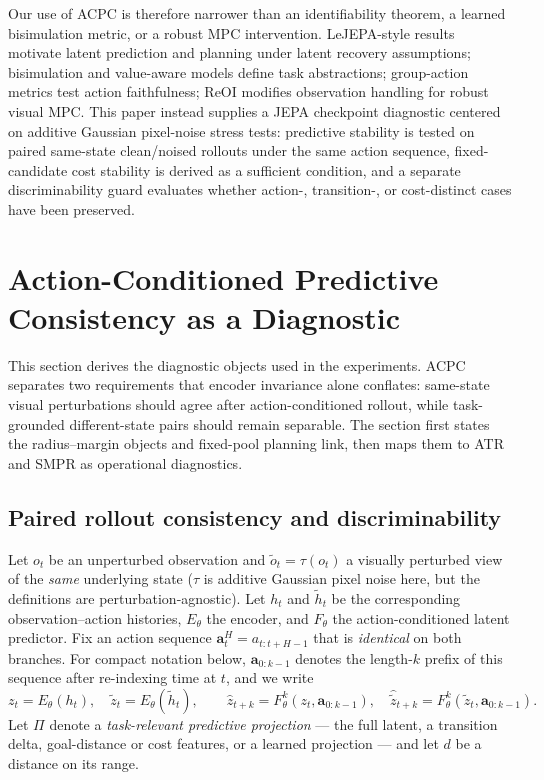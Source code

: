 \documentclass[10pt]{article}
\begin{document}
Our use of ACPC is therefore narrower than an identifiability theorem, a learned bisimulation metric, or a robust MPC intervention. LeJEPA-style results motivate latent prediction and planning under latent recovery assumptions; bisimulation and value-aware models define task abstractions; group-action metrics test action faithfulness; ReOI modifies observation handling for robust visual MPC. This paper instead supplies a JEPA checkpoint diagnostic centered on additive Gaussian pixel-noise stress tests: predictive stability is tested on paired same-state clean/noised rollouts under the same action sequence, fixed-candidate cost stability is derived as a sufficient condition, and a separate discriminability guard evaluates whether action-, transition-, or cost-distinct cases have been preserved.

\section{Action-Conditioned Predictive Consistency as a Diagnostic}\label{sec:acpc}

This section derives the diagnostic objects used in the experiments. ACPC separates two requirements that encoder invariance alone conflates: same-state visual perturbations should agree after action-conditioned rollout, while task-grounded different-state pairs should remain separable. The section first states the radius--margin objects and fixed-pool planning link, then maps them to ATR and SMPR as operational diagnostics.


\subsection{Paired rollout consistency and discriminability}\label{sec:acpc-def}

Let $o_t$ be an unperturbed observation and $\tilde o_t = \tau(o_t)$ a visually perturbed view of the \emph{same} underlying state ($\tau$ is additive Gaussian pixel noise here, but the definitions are perturbation-agnostic). Let $h_t$ and $\tilde h_t$ be the corresponding observation--action histories, $E_\theta$ the encoder, and $F_\theta$ the action-conditioned latent predictor. Fix an action sequence $\mathbf a^H_t = a_{t:t+H-1}$ that is \emph{identical} on both branches. For compact notation below, $\mathbf a_{0:k-1}$ denotes the length-$k$ prefix of this sequence after re-indexing time at $t$, and we write
\begin{equation}
  z_t = E_\theta(h_t), \quad \tilde z_t = E_\theta(\tilde h_t), \qquad
  \hat z_{t+k} = F_\theta^{k}(z_t, \mathbf a_{0:k-1}), \quad
  \hat{\tilde z}_{t+k} = F_\theta^{k}(\tilde z_t, \mathbf a_{0:k-1}).
  \label{eq:acpc-objects}
\end{equation}
Let $\Pi$ denote a \emph{task-relevant predictive projection} --- the full latent, a transition delta, goal-distance or cost features, or a learned projection --- and let $d$ be a distance on its range.
\end{document}
